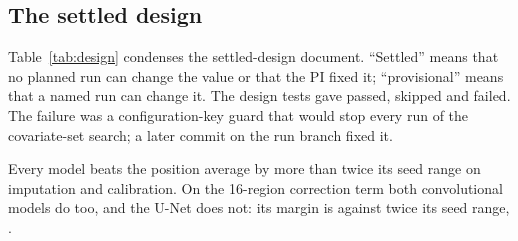 \documentclass[pdflatex,sn-mathphys-num]{sn-jnl}
\newcommand{\lit}[1]{#1}
\newcommand{\cl}[1]{#1}
\begin{document}
\subsection{The settled design}

\cl{Table~\ref{tab:design} condenses the settled-design document. ``Settled'' means that no planned run can change the value or that the PI fixed it; ``provisional'' means that a named run can change it. The design tests gave \testsPassed{} passed, \testsSkipped{} skipped and \testsFailed{} failed. The failure was a configuration-key guard that would stop every run of the covariate-set search; a later commit on the run branch fixed it.}

\cl{Every model beats the position average by more than twice its seed range on imputation and calibration. On the \lit{16}-region correction term both convolutional models do too, and the U-Net does not: its margin is \dTwoMarginUN{} against twice its seed range, \dTwoBarUN{}.}
\end{document}

